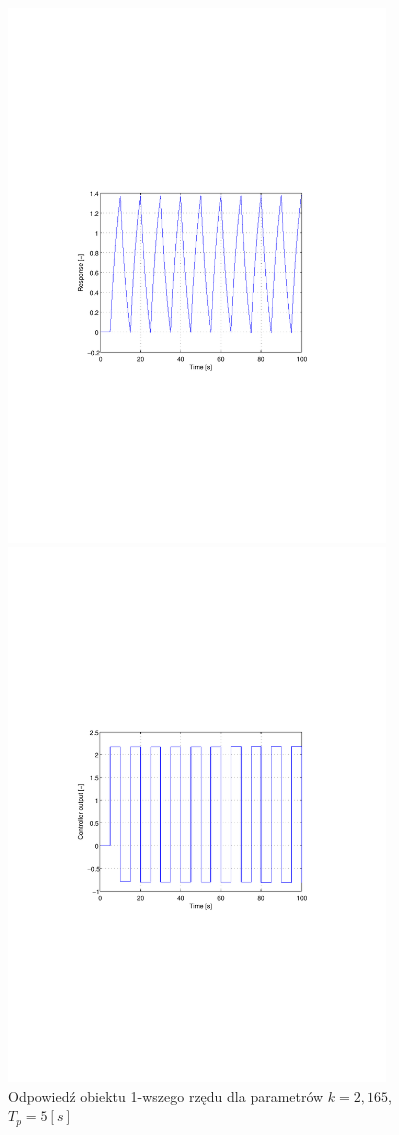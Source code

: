 \documentclass[12pt]{article}
\begin{document}
\newpage

\begin{figure}[!htb]
	\begin{center}
		\includegraphics[trim=5cm 9cm 5cm
		9cm,width=10cm]{../res/img/d1_5_2,165y.pdf}
	\end{center}
	
	\begin{center}
		\includegraphics[trim=5cm 9cm 5cm
		9cm,width=10cm]{../res/img/d1_5_2,165u.pdf}
	\end{center}
	\caption{Odpowiedź obiektu 1-wszego rzędu dla parametrów $k=2,165$,
	$T_p=5[s]$}
\end{figure}
\end{document}
